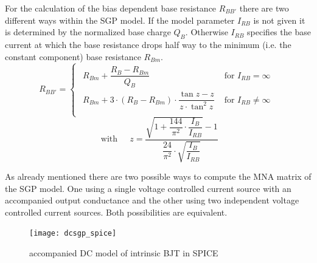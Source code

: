 \documentclass[10pt]{report}
\begin{document}
For the calculation of the bias dependent base resistance $R_{BB'}$
there are two different ways within the SGP model.  If the model
parameter $I_{RB}$ is not given it is determined by the normalized
base charge $Q_B$.  Otherwise $I_{RB}$ specifies the base current at
which the base resistance drops half way to the minimum (i.e. the
constant component) base resistance $R_{Bm}$.
\begin{equation}
R_{BB'} =
\begin{cases}
\begin{array}{ll}
R_{Bm} + \dfrac{R_B - R_{Bm}}{Q_B} & \text{ for } I_{RB} = \infty\\
R_{Bm} + 3\cdot \left(R_B - R_{Bm}\right)\cdot \dfrac{\tan{z} - z}{z\cdot \tan^2{z}} & \text{ for } I_{RB} \neq \infty\\
\end{array}
\end{cases}
\end{equation}
\begin{equation}
\text{ with } \;\;\;\;
z = \frac{\sqrt{1 + \dfrac{144}{\pi^2}\cdot\dfrac{I_B}{I_{RB}}} -1}{\dfrac{24}{\pi^2}\cdot\sqrt{\dfrac{I_B}{I_{RB}}}}
\end{equation}

As already mentioned there are two possible ways to compute the MNA
matrix of the SGP model.  One using a single voltage controlled
current source with an accompanied output conductance and the other
using two independent voltage controlled current sources.  Both
possibilities are equivalent.

\begin{figure}[ht]
\begin{center}
\texttt{[image: dcsgp\_spice]}
\end{center}
\caption{accompanied DC model of intrinsic BJT in SPICE}
\label{fig:dcsgp_spice}
\end{figure}
\FloatBarrier
\end{document}

